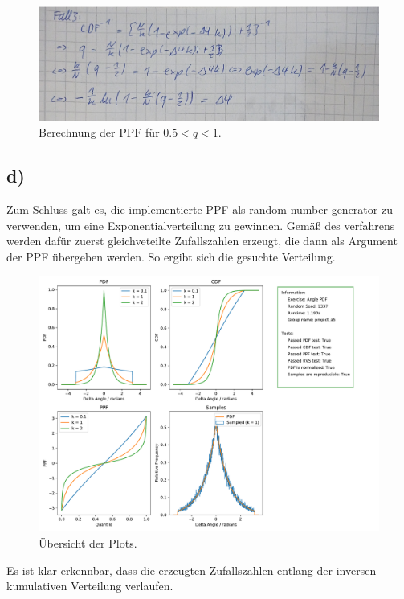     \begin{figure}
        \centering
        \includegraphics[width=\textwidth]{Aufgabe9/c2.pdf}
        \caption{Berechnung der PPF für $0.5 < q < 1$.}
        \label{fig:fallzwei}
    \end{figure}
    \FloatBarrier

\subsection{d)}
    Zum Schluss galt es, die implementierte PPF als random number generator zu verwenden, um eine Exponentialverteilung zu gewinnen. Gemäß des verfahrens werden dafür 
    zuerst gleichveteilte Zufallszahlen erzeugt, die dann als Argument der PPF übergeben werden. So ergibt sich die gesuchte Verteilung.\\
    \begin{figure}
        \includegraphics[width=\textwidth]{Aufgabe9/exercise_angle_pdf.pdf}
        \caption{Übersicht der Plots.}
        \label{fig:ubersicht}
    \end{figure}
    \FloatBarrier

    \noindent Es ist klar erkennbar, dass die erzeugten Zufallszahlen entlang der inversen kumulativen Verteilung verlaufen. 